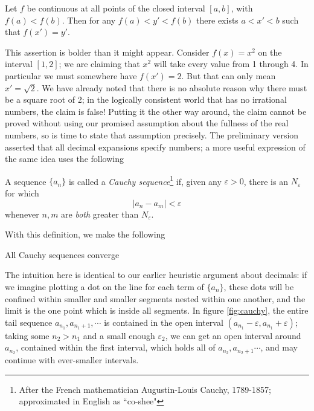 \begin{claim}\label{claim:intermediateValue}
Let $f$ be continuous at all points of the closed interval $[a,b]$, with $f(a)<f(b)$. Then for any $f(a) < y' < f(b)$ there exists $a < x' < b$ such that $f(x') = y'$.
\end{claim}
This assertion is bolder than it might appear. Consider $f(x)=x^2$ on the interval $[1,2]$; we are claiming that $x^2$ will take every value from 1 through 4. In particular we must somewhere have $f(x') = 2$. But that can only mean $x' = \sqrt{2}$. We have already noted that there is no absolute reason why there must be a square root of 2; in the logically consistent world that has no irrational numbers, the claim is false! Putting it the other way around, the claim cannot be proved without using our promised assumption about the fullness of the real numbers, so is time to state that assumption precisely. The preliminary version asserted that all decimal expansions specify numbers; a more useful expression of the same idea uses the following 

\begin{defn}
A sequence $\{a_n\}$ is called a \emph{Cauchy sequence}\footnote{After the French mathematician Augustin-Louis Cauchy, 1789-1857; approximated in English as ``co-shee"} if, given any $\varepsilon > 0$, there is an $N_\varepsilon$ for which
\[
|a_n - a_m| < \varepsilon
\]
whenever $n,m$ are \emph{both} greater than $N_\varepsilon$.
\end{defn}

With this definition, we make the following

\begin{assumption}
All Cauchy sequences converge
\end{assumption}

The intuition here is identical to our earlier heuristic argument about decimals: if we imagine plotting a dot on the line for each term of $\{a_n\}$, these dots will be confined within smaller and smaller segments nested within one another, and the limit is the one point which is inside all segments. In figure \ref{fig:cauchy}, the entire tail sequence $a_{n_1}, a_{n_1+1}, \cdots$ is contained in the open interval $(a_{n_1}-\varepsilon, a_{n_1}+\varepsilon)$; taking some $n_2>n_1$ and a small enough $\varepsilon_2$, we can get an open interval around $a_{n_2}$, contained within the first interval, which holds all of $a_{n_2}, a_{n_2+1} \cdots$, and may continue with ever-smaller intervals.

